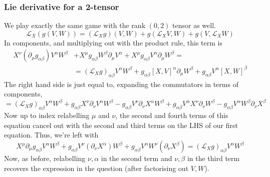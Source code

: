 \documentclass[11pt, a4paper]{article}   	%
\theoremstyle{slplain}
\begin{document}
\subsubsection*{Lie derivative for a 2-tensor} 
We play exactly the same game with 
the rank $ ( 0 , 2) $ tensor as well. 
 \[
	 \mathcal{L }_ X  ( g ( V , W) ) = (\mathcal{L }_{X } g ) ( V, W) + g ( \mathcal{L }_X V, W ) + g ( V, \mathcal{L }_X W )  
\] In components, and multiplying out with the product rule, 
this term is 
\begin{align*}
	X^\nu (\partial  _\mu g_{ \alpha \beta }) V^\alpha W^\beta & + X^\mu g_{ \alpha \beta } W ^ \beta \partial _\mu V ^\alpha + X^\mu g _{ \alpha \beta } V^\alpha \partial _\mu W^ \beta  = \\ 																	    & = ( \mathcal{ L }_X g ) _{ \alpha \beta } V^ \alpha W ^ \beta + g_{ \alpha \beta } [ X , V]^ \alpha \partial _\mu W^ \beta + g_{ \alpha \beta } V ^ \alpha [ X, W ] ^ \beta 	    
\end{align*} The right hand side 
is just equal to, expanding the commutators in terms of components, 
\[
	= ( \mathcal{ L }_X g ) _{ \alpha \beta } V ^ \alpha W ^ \beta + g_{ \alpha \beta } X^\nu \partial  _\nu V ^ \alpha W ^ \beta  -g _{ \alpha \beta } V ^\nu \partial _\nu X ^ \alpha W ^ \beta + g_{ \alpha \beta } V ^ \alpha X ^ \nu \partial  _\nu W ^ \beta - g_{ \alpha \beta } V ^ \alpha W ^ \beta \partial  _\nu X  ^ \beta 
\] Now up to index relabelling $ \mu $ and $ \nu $, the second and fourth 
terms of this equation cancel out with the second and third terms on the LHS of our first equation. 
Thus, we're left with 
\[
X^\mu \partial _\mu g_{ \alpha \beta } V ^ \alpha W ^ \beta + g_{ \alpha \beta } V ^ \nu ( \partial  _\nu X ^ \alpha ) W ^ \beta + g _{ \alpha \beta } V ^ \alpha W^\nu ( \partial  _\nu X ^ \beta ) = ( \mathcal{ L }_ X g )_{ \alpha \beta } V ^ \alpha W ^ \beta 
\] Now, as before, relabelling $ \nu , \alpha$ in the second term and $ \nu , \beta $ in the third term 
recovers the expression in the question (after factorising out  $ V , W $).
\end{document}
